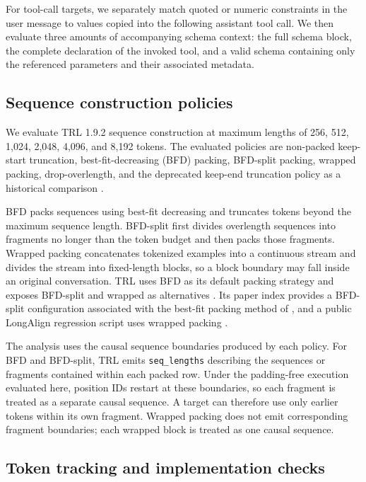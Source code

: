 \documentclass[pdflatex,sn-basic,Numbered]{sn-jnl}
\begin{document}
For tool-call targets, we separately match quoted or numeric constraints in the user message to values copied into the following assistant tool call. We then evaluate three amounts of accompanying schema context: the full schema block, the complete declaration of the invoked tool, and a valid schema containing only the referenced parameters and their associated metadata.


\subsection{Sequence construction policies}
\label{sec:policies}

We evaluate TRL 1.9.2 sequence construction at maximum lengths of 256, 512, 1,024, 2,048, 4,096, and 8,192 tokens. The evaluated policies are non-packed keep-start truncation, best-fit-decreasing (BFD) packing, BFD-split packing, wrapped packing, drop-overlength, and the deprecated keep-end truncation policy as a historical comparison \citep{trl2026,huggingface2026sft}.

BFD packs sequences using best-fit decreasing and truncates tokens beyond the maximum sequence length. BFD-split first divides overlength sequences into fragments no longer than the token budget and then packs those fragments. Wrapped packing concatenates tokenized examples into a continuous stream and divides the stream into fixed-length blocks, so a block boundary may fall inside an original conversation. TRL uses BFD as its default packing strategy and exposes BFD-split and wrapped as alternatives \citep{huggingface2026sft}. Its paper index provides a BFD-split configuration associated with the best-fit packing method of \citet{ding2024fewer}, and a public LongAlign regression script uses wrapped packing \citep{huggingface2026paperindex,diro2026wrapped}.

The analysis uses the causal sequence boundaries produced by each policy. For BFD and BFD-split, TRL emits \texttt{seq\_lengths} describing the sequences or fragments contained within each packed row. Under the padding-free execution evaluated here, position IDs restart at these boundaries, so each fragment is treated as a separate causal sequence. A target can therefore use only earlier tokens within its own fragment. Wrapped packing does not emit corresponding fragment boundaries; each wrapped block is treated as one causal sequence.


\subsection{Token tracking and implementation checks}
\label{sec:conformance}
\end{document}
